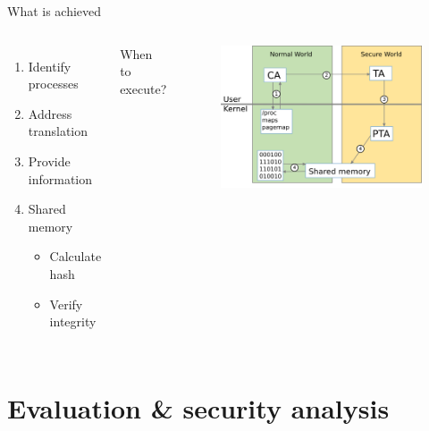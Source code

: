 \documentclass[]{beamer}
\begin{document}
\begin{frame}{What is achieved}
\begin{columns}
\begin{enumerate}
\item Identify processes
\item Address translation
\item Provide information
\item Shared memory \begin{itemize}
\item Calculate hash
\item Verify integrity
\end{itemize}
\end{enumerate}
\bigskip
When to execute?
\begin{figure}
\includegraphics[width=1\textwidth]{Pictures/implementation.png}
\end{figure}
\end{columns}
\end{frame}

\section{Evaluation \& security analysis}
\end{document}
